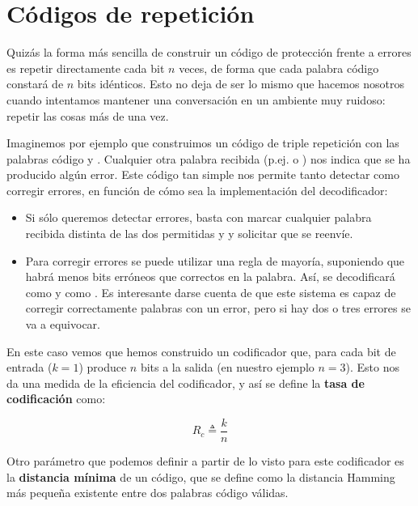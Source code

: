 \documentclass[es,apuntes]{uah}
\begin{document}
\section{Códigos de repetición}

Quizás la forma más sencilla de construir un código de protección frente a errores es repetir directamente cada bit $n$ veces, de forma que cada palabra código constará de $n$ bits idénticos. Esto no deja de ser lo mismo que hacemos nosotros cuando intentamos mantener una conversación en un ambiente muy ruidoso: repetir las cosas más de una vez. 

 Imaginemos por ejemplo que construimos un código de triple repetición con las palabras código  y . Cualquier otra palabra recibida (p.ej.  o ) nos indica que se ha producido algún error. Este código tan simple nos permite tanto detectar como corregir errores, en función de cómo sea la implementación del decodificador:
 
 \begin{itemize}
 	\item Si sólo queremos detectar errores, basta con marcar cualquier palabra recibida distinta de las dos permitidas  y  y solicitar que se reenvíe.
 	\item Para corregir errores se puede utilizar una regla de mayoría, suponiendo que habrá menos bits erróneos que correctos en la palabra. Así,  se decodificará como  y  como . Es interesante darse cuenta de que este sistema es capaz de corregir correctamente palabras con un error, pero si hay dos o tres errores se va a equivocar. 
 \end{itemize}
 
 En este caso vemos que hemos construido un codificador que, para cada bit de entrada ($k=1$) produce $n$ bits a la salida (en nuestro ejemplo $n=3$). Esto nos da una medida de la eficiencia del codificador, y así se define la {\bf tasa de codificación} como:
 
 \begin{displaymath}
 	R_c \triangleq \frac{k}{n}
 \end{displaymath}
 
 Otro parámetro que podemos definir a partir de lo visto para este codificador es la {\bf distancia mínima} de un código, que se define como la distancia Hamming más pequeña existente entre dos palabras código válidas. 
 
\end{document}
